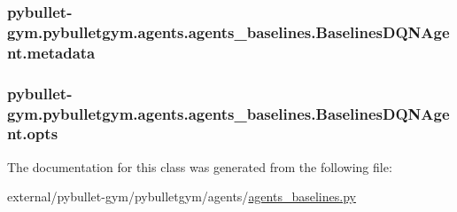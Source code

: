 \subsubsection[{\texorpdfstring{metadata}{metadata}}]{\setlength{\rightskip}{0pt plus 5cm}pybullet-\/gym.\+pybulletgym.\+agents.\+agents\+\_\+baselines.\+Baselines\+D\+Q\+N\+Agent.\+metadata}\hypertarget{classpybullet-gym_1_1pybulletgym_1_1agents_1_1agents__baselines_1_1_baselines_d_q_n_agent_adf551f8528a7c040dc0877703b553834}{}\label{classpybullet-gym_1_1pybulletgym_1_1agents_1_1agents__baselines_1_1_baselines_d_q_n_agent_adf551f8528a7c040dc0877703b553834}
\subsubsection[{\texorpdfstring{opts}{opts}}]{\setlength{\rightskip}{0pt plus 5cm}pybullet-\/gym.\+pybulletgym.\+agents.\+agents\+\_\+baselines.\+Baselines\+D\+Q\+N\+Agent.\+opts}\hypertarget{classpybullet-gym_1_1pybulletgym_1_1agents_1_1agents__baselines_1_1_baselines_d_q_n_agent_a4c6f293de7a97e43d78e0adeb0c7c11d}{}\label{classpybullet-gym_1_1pybulletgym_1_1agents_1_1agents__baselines_1_1_baselines_d_q_n_agent_a4c6f293de7a97e43d78e0adeb0c7c11d}


The documentation for this class was generated from the following file\+:\begin{DoxyCompactItemize}
\item 
external/pybullet-\/gym/pybulletgym/agents/\hyperlink{agents__baselines_8py}{agents\+\_\+baselines.\+py}\end{DoxyCompactItemize}
